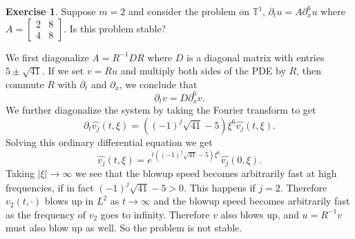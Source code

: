 \documentclass[10pt]{article}
\newcommand{\Torus}{\mathbb T}
\theoremstyle{definition}
\newtheorem{exer}{Exercise}
\begin{document}
\begin{exer}
Suppose $m = 2$ and consider the problem on $\Torus^1$, $\partial_t u = A \partial_x^6 u$ where $A = \begin{bmatrix}2 & 8 \\  4 & 8\end{bmatrix}$.
Is this problem stable?
\end{exer}

We first diagonalize $A = R^{-1}DR$ where $D$ is a diagonal matrix with entries $5 \pm \sqrt{41}$.
If we set $v = Ru$ and multiply both sides of the PDE by $R$, then commute $R$ with $\partial_t$ and $\partial_x$, we conclude that
$$\partial_t v = D\partial_x^6 v.$$
We further diagonalize the system by taking the Fourier transform to get
$$\partial_t \widehat{v_j}(t, \xi) = ((-1)^j \sqrt{41} - 5)\xi^6 \widehat{v_j}(t, \xi).$$
Solving this ordinary differential equation we get
$$\widehat{v_j}(t, \xi) = e^{t((-1)^j \sqrt{41} - 5)\xi^6} \widehat{v_j}(0, \xi).$$
Taking $|\xi| \to \infty$ we see that the blowup speed becomes arbitrarily fast at high frequencies, if in fact $(-1)^j\sqrt{41} - 5 > 0$.
This happens if $j = 2$.
Therefore $v_2(t, \cdot)$ blows up in $L^2$ as $t \to \infty$ and the blowup speed becomes arbitrarily fast as the frequency of $v_2$ goes to infinity.
Therefore $v$ also blows up, and $u = R^{-1}v$ must also blow up as well.
So the problem is not stable.
\end{document}
